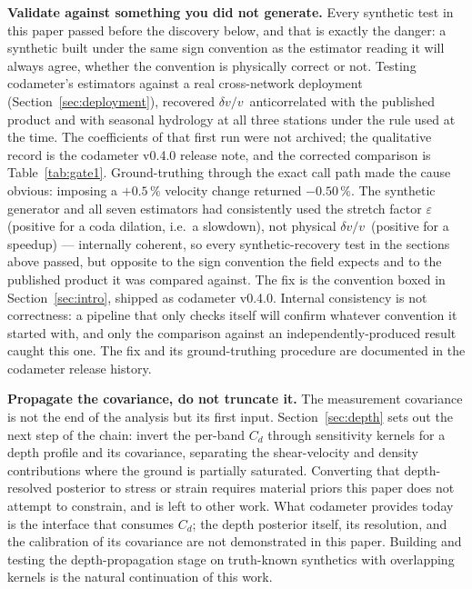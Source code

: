 \documentclass[
  referee]{gji}
\providecommand{\dvv}{\ensuremath{\delta v/v}}
\begin{document}
\textbf{Validate against something you did not generate.} Every
synthetic test in this paper passed before the discovery below, and that
is exactly the danger: a synthetic built under the same sign convention
as the estimator reading it will always agree, whether the convention is
physically correct or not. Testing codameter's estimators against a real
cross-network deployment (Section~\ref{sec:deployment}), recovered
\dvv~anticorrelated with the published \citet{Clements2023} product and
with seasonal hydrology at all three stations under the rule used at the
time. The coefficients of that first run were not archived; the
qualitative record is the codameter v0.4.0 release note, and the
corrected comparison is Table~\ref{tab:gate1}. Ground-truthing through
the exact call path made the cause obvious: imposing a \(+0.5\,\%\)
velocity change returned \(-0.50\,\%\). The synthetic generator and all
seven estimators had consistently used the stretch factor
\(\varepsilon\) (positive for a coda dilation, i.e.~a slowdown), not
physical \dvv~(positive for a speedup) --- internally coherent, so every
synthetic-recovery test in the sections above passed, but opposite to
the sign convention the field expects and to the published product it
was compared against. The fix is the convention boxed in
Section~\ref{sec:intro}, shipped as codameter v0.4.0. Internal
consistency is not correctness: a pipeline that only checks itself will
confirm whatever convention it started with, and only the comparison
against an independently-produced result caught this one. The fix and
its ground-truthing procedure are documented in the codameter release
history.

\textbf{Propagate the covariance, do not truncate it.} The measurement
covariance is not the end of the analysis but its first input.
Section~\ref{sec:depth} sets out the next step of the chain: invert the
per-band \(C_d\) through sensitivity kernels for a depth profile and its
covariance, separating the shear-velocity and density contributions
where the ground is partially saturated. Converting that depth-resolved
posterior to stress or strain requires material priors this paper does
not attempt to constrain, and is left to other work. What codameter
provides today is the interface that consumes \(C_d\); the depth
posterior itself, its resolution, and the calibration of its covariance
are not demonstrated in this paper. Building and testing the
depth-propagation stage on truth-known synthetics with overlapping
kernels is the natural continuation of this work.
\end{document}
